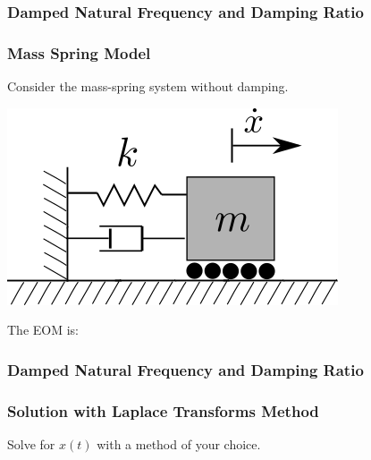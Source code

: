 \documentclass[fleqn]{beamer} %
\newcommand{\sectionIIsubsectionItitle}{Damped Natural Frequency and Damping Ratio}
\begin{document}
			\begin{frame}[label=sectionIIsubsectionI]
				\frametitle{\sectionIIsubsectionItitle}
				\bigskip

				\frametitle{Mass Spring Model}

				\large Consider the mass-spring system without damping.\vspc

				\includegraphics[scale=.5]{images/mass_spring_01.png} \vspc

				\large The EOM is:\vspc

					 \vspc
					\vspc

								
				\btVFill
			\end{frame}

			\begin{frame}[label=sectionIIsubsectionI]
				\frametitle{\sectionIIsubsectionItitle}
				\bigskip

				\frametitle{Solution with Laplace Transforms Method}

				\large Solve for $x(t)$ with a method of your choice. \vspace{40mm}\\


				 \vspc


				\btVFill
			\end{frame}
\end{document}

